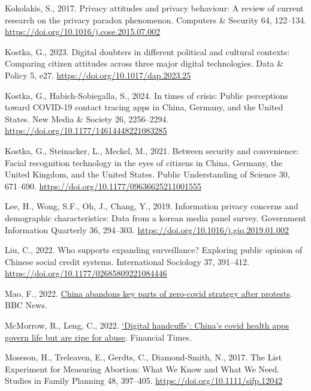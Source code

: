 \documentclass[
  letterpaper,
  DIV=11,
  numbers=noendperiod]{scrartcl}
\newlength{\cslhangindent}
\newenvironment{CSLReferences}[2] %
 {\begin{list}{}{%
  \setlength{\itemindent}{0pt}
  \setlength{\leftmargin}{0pt}
  \setlength{\parsep}{0pt}
  \ifodd #1
   \setlength{\leftmargin}{\cslhangindent}
   \setlength{\itemindent}{-1\cslhangindent}
  \fi
  \setlength{\itemsep}{#2\baselineskip}}}
 {\end{list}}
\begin{document}
\begin{CSLReferences}{1}{0}
Kokolakis, S., 2017. Privacy attitudes and privacy behaviour: A review
of current research on the privacy paradox phenomenon. Computers \&
Security 64, 122--134. \url{https://doi.org/10.1016/j.cose.2015.07.002}

Kostka, G., 2023. Digital doubters in different political and cultural
contexts: Comparing citizen attitudes across three major digital
technologies. Data \& Policy 5, e27.
\url{https://doi.org/10.1017/dap.2023.25}

Kostka, G., Habich-Sobiegalla, S., 2024. In times of crisis: Public
perceptions toward COVID-19 contact tracing apps in China, Germany, and
the United States. New Media \& Society 26, 2256--2294.
\url{https://doi.org/10.1177/14614448221083285}

Kostka, G., Steinacker, L., Meckel, M., 2021. Between security and
convenience: Facial recognition technology in the eyes of citizens in
China, Germany, the United Kingdom, and the United States. Public
Understanding of Science 30, 671--690.
\url{https://doi.org/10.1177/09636625211001555}

Lee, H., Wong, S.F., Oh, J., Chang, Y., 2019. Information privacy
concerns and demographic characteristics: Data from a korean media panel
survey. Government Information Quarterly 36, 294--303.
\url{https://doi.org/10.1016/j.giq.2019.01.002}

Liu, C., 2022. Who supports expanding surveillance? Exploring public
opinion of Chinese social credit systems. International Sociology 37,
391--412. \url{https://doi.org/10.1177/02685809221084446}

Mao, F., 2022.
\href{https://www.bbc.com/news/world-asia-china-63855508}{China abandons
key parts of zero-covid strategy after protests}. BBC News.

McMorrow, R., Leng, C., 2022.
\href{https://www.ft.com/content/dee6bcc6-3fc5-4edc-814d-46dc73e67c7e}{{`}Digital
handcuffs{'}: China{'}s covid health apps govern life but are ripe for
abuse}. Financial Times.

Moseson, H., Treleaven, E., Gerdts, C., Diamond-Smith, N., 2017. The
List Experiment for Measuring Abortion: What We Know and What We Need.
Studies in Family Planning 48, 397--405.
\url{https://doi.org/10.1111/sifp.12042}


\end{CSLReferences}
\end{document}
